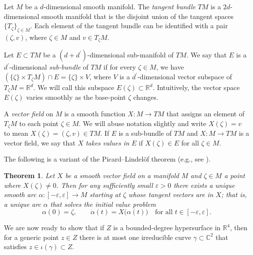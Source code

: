 \documentclass[letterpaper, reqno,11pt]{article}
\newtheorem{theorem}{Theorem}[section]
\theoremstyle{remark}
\newcommand{\RR}{\mathbb{R}}
\newcommand{\CC}{\mathbb{C}}
\begin{document}
Let $M$ be a $d$-dimensional smooth manifold. The \emph{tangent bundle} $TM$ is a $2d$-dimensional smooth manifold that is the disjoint union of the tangent spaces $\{T_\zeta\}_{\zeta\in M}$. Each element of the tangent bundle can be identified with a pair $(\zeta,v)$, where $\zeta\in M$ and $v\in T_{\zeta}M$.

Let $E\subset TM$ be a $(d+d^\prime)$-dimensional sub-manifold of $TM$. We say that $E$ is a $d^\prime$-dimensional \emph{sub-bundle} of $TM$ if for every $\zeta\in M$, we have $(\{\zeta\}\times T_\zeta M)\cap E=\{\zeta\}\times V$, where $V$ is a $d^\prime$-dimensional vector subspace of $ T_\zeta M=\RR^d$. We will call this subspace $E(\zeta)\subset\RR^d$. Intuitively, the vector space $E(\zeta)$ varies smoothly as the base-point $\zeta$ changes.

A \emph{vector field} on $M$ is a smooth function $X\colon M\to TM$
that assigns an element of $T_\zeta M$ to each point $\zeta\in M$. We
will abuse notation slightly and write $X(\zeta)=v$ to mean
$X(\zeta)=(\zeta,v)\in TM$. If $E$ is a sub-bundle of $TM$ and
$X\colon M\to TM$ is a vector field, we say that $X$ \emph{takes
  values in} $E$ if $X(\zeta)\in E$ for all $\zeta\in M$.


The following is a variant of the Picard--Lindel\"of theorem (e.g., see \cite{KP10}).

\begin{theorem}\label{PicardLindelof}
Let $X$ be a smooth vector field on a manifold $M$ and $\zeta\in M$ a point where $X(\zeta) \ne 0$.
Then for any sufficiently small $\varepsilon>0$ there exists a unique smooth arc $\alpha:[-\varepsilon,\varepsilon]\to M$ starting at $\zeta$ whose tangent vectors are in $X$; that is, a unique arc $\alpha$ that solves the initial
  value problem
  \begin{equation}
    \label{eq:1}
    \alpha(0)=\zeta,
    \quad\quad
    \dot\alpha(t) = X\big(\alpha(t)\big)
    \quad
    \text{for all }t\in[-\varepsilon,\varepsilon].
  \end{equation}
\end{theorem}

We are now ready to show that if $Z$ is a bounded-degree hypersurface in $\RR^4$, then for a generic point $z\in Z$ there is at most one irreducible curve $\gamma\subset\CC^2$ that satisfies $z\in \iota(\gamma) \subset Z$.
\end{document}
